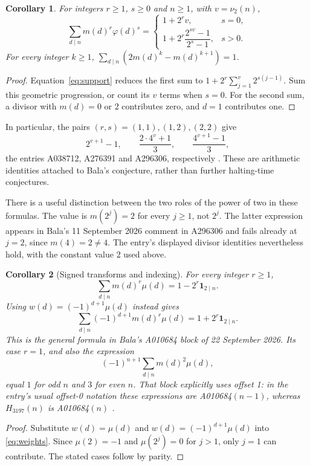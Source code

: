 \documentclass[11pt]{article}
\newtheorem{corollary}{Corollary}
\newcommand{\val}{\nu_2}
\begin{document}
\begin{corollary}\label{cor:mixed}
For integers $r\geq1$, $s\geq0$ and $n\geq1$, with $v=\val(n)$,
\[
\sum_{d\mid n}m(d)^r\varphi(d)^s=
\begin{cases}
1+2^rv,&s=0,\\[2pt]
1+2^r\dfrac{2^{sv}-1}{2^s-1},&s>0.
\end{cases}
\]
For every integer $k\geq1$,
$\sum_{d\mid n}(2m(d)^k-m(d)^{k+1})=1$.
\end{corollary}
\begin{proof}
Equation~\eqref{eq:support} reduces the first sum to
$1+2^r\sum_{j=1}^v2^{s(j-1)}$. Sum this geometric progression, or count its
$v$ terms when $s=0$. For the second sum, a divisor with $m(d)=0$ or $2$
contributes zero, and $d=1$ contributes one.
\end{proof}
In particular, the pairs $(r,s)=(1,1),(1,2),(2,2)$ give
\[
2^{v+1}-1,\qquad \frac{2\cdot4^v+1}{3},\qquad
\frac{4^{v+1}-1}{3},
\]
the entries A038712, A276391 and A296306, respectively
\cite{companions,ratio}. These are arithmetic identities attached to
Bala's conjecture, rather than further halting-time conjectures.

There is a useful distinction between the two roles of the power of two
in these formulas. The value is $m(2^j)=2$ for every $j\geq1$, not
$2^j$. The latter expression appears in Bala's 11 September 2026 comment
in A296306 and fails already at $j=2$, since $m(4)=2\ne4$.
The entry's displayed divisor identities nevertheless hold, with the
constant value $2$ used above.

\begin{corollary}[Signed transforms and indexing]\label{cor:signed}
For every integer $r\geq1$,
\begin{equation}\label{eq:signed}
 \sum_{d\mid n}m(d)^r\mu(d)=1-2^r\mathbf{1}_{2\mid n}.
\end{equation}
Using $w(d)=(-1)^{d+1}\mu(d)$ instead gives
\[
 \sum_{d\mid n}(-1)^{d+1}m(d)^r\mu(d)
 =1+2^r\mathbf{1}_{2\mid n}.
\]
This is the general formula in Bala's A010684 block of 22 September 2026.
Its case $r=1$, and also the expression
\[
 (-1)^{n+1}\sum_{d\mid n}m(d)^2\mu(d),
\]
equal $1$ for odd $n$ and $3$ for even $n$.
That block explicitly uses offset 1: in the entry's usual offset-0
notation these expressions are A010684$(n-1)$, whereas
$H_{3197}(n)$ is A010684$(n)$ \cite{comparisons}.
\end{corollary}
\begin{proof}
Substitute $w(d)=\mu(d)$ and $w(d)=(-1)^{d+1}\mu(d)$ into
\eqref{eq:weights}. Since $\mu(2)=-1$ and $\mu(2^j)=0$ for $j>1$,
only $j=1$ can contribute. The stated cases follow by parity.
\end{proof}
\end{document}
